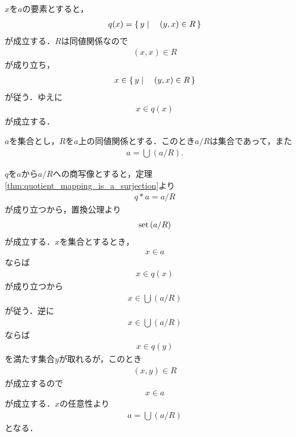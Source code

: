 	\begin{sketch}
		$x$を$a$の要素とすると，
		\begin{align}
			q(x) = \left\{\, y \mid \quad (y,x) \in R\, \right\}
		\end{align}
		が成立する．$R$は同値関係なので
		\begin{align}
			(x,x) \in R
		\end{align}
		が成り立ち，
		\begin{align}
			x \in \left\{\, y \mid \quad (y,x) \in R\, \right\}
		\end{align}
		が従う．ゆえに
		\begin{align}
			x \in q(x)
		\end{align}
		が成立する．
		\QED
	\end{sketch}
	
	\begin{screen}
		\begin{thm}[商集合の合併は割る前の集合に一致する]
		\label{thm:union_of_quotient_set_is_the_original_set}
			$a$を集合とし，$R$を$a$上の同値関係とする．このとき$a/R$は集合であって，また
			\begin{align}
				a = \bigcup (a/R).
			\end{align}
		\end{thm}
	\end{screen}
	
	\begin{prf}
		$q$を$a$から$a/R$への商写像とすると，定理\ref{thm:quotient_mapping_is_a_surjection}より
		\begin{align}
			q \ast a = a/R
		\end{align}
		が成り立つから，置換公理より
		\begin{align}
			\operatorname*{set} \left(a/R\right)
		\end{align}
		が成立する．$x$を集合とするとき，
		\begin{align}
			x \in a
		\end{align}
		ならば
		\begin{align}
			x \in q(x)
		\end{align}
		が成り立つから
		\begin{align}
			x \in \bigcup (a/R)
		\end{align}
		が従う．逆に
		\begin{align}
			x \in \bigcup (a/R)
		\end{align}
		ならば
		\begin{align}
			x \in q(y)
		\end{align}
		を満たす集合$y$が取れるが，このとき
		\begin{align}
			(x,y) \in R
		\end{align}
		が成立するので
		\begin{align}
			x \in a
		\end{align}
		が成立する．$x$の任意性より
		\begin{align}
			a = \bigcup (a/R)
		\end{align}
		となる．
		\QED
	\end{prf}
	
